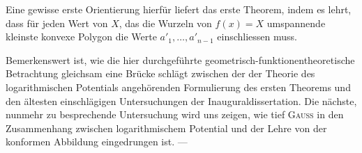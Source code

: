Eine gewisse erste Orientierung hierfür liefert das erste Theorem, indem es
lehrt, dass für jeden Wert von \(X\), das die Wurzeln von \(f(x)=X\) umspannende
kleinste konvexe Polygon die  Werte \(a'_1,\ldots,a'_{n-1}\) einschliessen
muss.

Bemerkenswert ist, wie die hier durchgeführte geometrisch-funktionentheoretische
Betrachtung gleichsam eine Brücke schlägt zwischen der der Theorie
des logarithmischen Potentials angehörenden Formulierung des ersten Theorems
und den ältesten einschlägigen Untersuchungen der Inauguraldissertation. Die
nächste, nunmehr zu besprechende Untersuchung wird uns zeigen, wie tief
\textsc{Gauss} in den Zusammenhang zwischen logarithmischem Potential und der
Lehre von der konformen Abbildung eingedrungen ist. —

